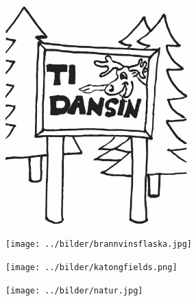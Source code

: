 %


\begin{figure}[!b]
	\includegraphics[width=7cm]{../bilder/fardigabilder/BilderTillKapitel/tidansin.png} 
\end{figure}
\clearpage

\clearpage

\clearpage

\clearpage

\begin{figure}[!b]
\begin{center}
\texttt{[image: ../bilder/brannvinsflaska.jpg]} 
\end{center}
\end{figure}
\clearpage

\clearpage

\begin{figure}[!h]
\begin{center}
\texttt{[image: ../bilder/katongfields.png]} 
\end{center}
\end{figure}

\begin{figure}[!b]
\begin{center}
\texttt{[image: ../bilder/natur.jpg]} 
\end{center}
\end{figure}
\clearpage

\clearpage

\clearpage

\clearpage

%